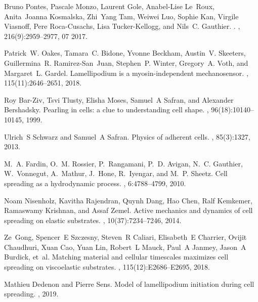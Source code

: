 \documentclass[pre,amsmath]{revtex4}
\begin{document}
\begin{thebibliography}{10}
Bruno Pontes, Pascale Monzo, Laurent Gole, Anabel-Lise Le~Roux, Anita~Joanna
  Kosmalska, Zhi~Yang Tam, Weiwei Luo, Sophie Kan, Virgile Viasnoff, Pere
  Roca-Cusachs, Lisa Tucker-Kellogg, and Nils~C. Gauthier.
.
, 216(9):2959--2977, 07 2017.

Patrick~W. Oakes, Tamara~C. Bidone, Yvonne Beckham, Austin~V. Skeeters,
  Guillermina~R. Ramirez-San~Juan, Stephen~P. Winter, Gregory~A. Voth, and
  Margaret~L. Gardel.
\newblock Lamellipodium is a myosin-independent mechanosensor.
,
  115(11):2646--2651, 2018.

Roy Bar-Ziv, Tsvi Tlusty, Elisha Moses, Samuel~A Safran, and Alexander
  Bershadsky.
\newblock Pearling in cells: a clue to understanding cell shape.
,
  96(18):10140--10145, 1999.

Ulrich~S Schwarz and Samuel~A Safran.
\newblock Physics of adherent cells.
, 85(3):1327, 2013.

M.~A. Fardin, O.~M. Rossier, P.~Rangamani, P.~D. Avigan, N.~C. Gauthier,
  W.~Vonnegut, A.~Mathur, J.~Hone, R.~Iyengar, and M.~P. Sheetz.
\newblock Cell spreading as a hydrodynamic process.
, 6:4788--4799, 2010.

Noam Nisenholz, Kavitha Rajendran, Quynh Dang, Hao Chen, Ralf Kemkemer,
  Ramaswamy Krishnan, and Assaf Zemel.
\newblock Active mechanics and dynamics of cell spreading on elastic
  substrates.
, 10(37):7234--7246, 2014.

Ze~Gong, Spencer~E Szczesny, Steven~R Caliari, Elisabeth~E Charrier, Ovijit
  Chaudhuri, Xuan Cao, Yuan Lin, Robert~L Mauck, Paul~A Janmey, Jason~A
  Burdick, et~al.
\newblock Matching material and cellular timescales maximizes cell spreading on
  viscoelastic substrates.
,
  115(12):E2686--E2695, 2018.

Mathieu Dedenon and Pierre Sens.
\newblock Model of lamellipodium initiation during cell spreading.
, 2019.


\end{thebibliography}
\end{document}
